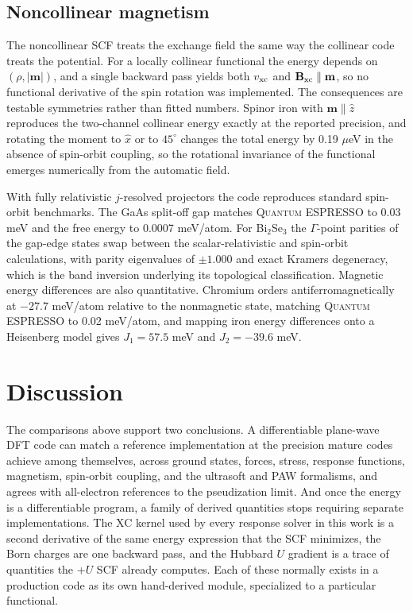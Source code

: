 \documentclass[11pt,twocolumn]{article}
\newcommand{\qe}{\textsc{Quantum ESPRESSO}}
\begin{document}
\subsection{Noncollinear magnetism}
\label{sec:ncl}

The noncollinear SCF treats the exchange field the same way the collinear
code treats the potential. For a locally collinear functional the energy
depends on $(\rho, |\mathbf{m}|)$, and a single backward pass yields both
$v_{\rm xc}$ and $\mathbf{B}_{\rm xc} \parallel \mathbf{m}$, so no
functional derivative of the spin rotation was implemented. The
consequences are testable symmetries rather than fitted numbers. Spinor
iron with $\mathbf{m} \parallel \hat z$ reproduces the two-channel
collinear energy exactly at the reported precision, and rotating the
moment to $\hat x$ or to $45^\circ$ changes the total energy by 0.19
$\mu$eV in the absence of spin-orbit coupling, so the rotational
invariance of the functional emerges numerically from the automatic
field.

With fully relativistic $j$-resolved projectors the code reproduces
standard spin-orbit benchmarks. The GaAs split-off gap matches \qe{} to
0.03 meV and the free energy to 0.0007 meV/atom. For Bi$_2$Se$_3$ the
$\Gamma$-point parities of the gap-edge states swap between the
scalar-relativistic and spin-orbit calculations, with parity eigenvalues
of $\pm 1.000$ and exact Kramers degeneracy, which is the band inversion
underlying its topological classification. Magnetic energy differences
are also quantitative. Chromium orders antiferromagnetically at $-27.7$
meV/atom relative to the nonmagnetic state, matching \qe{} to 0.02
meV/atom, and mapping iron energy differences onto a Heisenberg model
gives $J_1 = 57.5$ meV and $J_2 = -39.6$ meV.

\section{Discussion}
\label{sec:disc}

The comparisons above support two conclusions. A differentiable plane-wave
DFT code can match a reference implementation at the precision mature codes
achieve among themselves, across ground states, forces, stress, response
functions, magnetism, spin-orbit coupling, and the ultrasoft and PAW
formalisms, and agrees with all-electron references to the pseudization
limit. And once the energy is a differentiable
program, a family of derived quantities stops requiring separate
implementations. The XC kernel used by every response solver in this work
is a second derivative of the same energy expression that the SCF
minimizes, the Born charges are one backward pass, and the Hubbard $U$
gradient is a trace of quantities the +$U$ SCF already computes. Each of
these normally exists in a production code as its own hand-derived module,
specialized to a particular functional.
\end{document}
